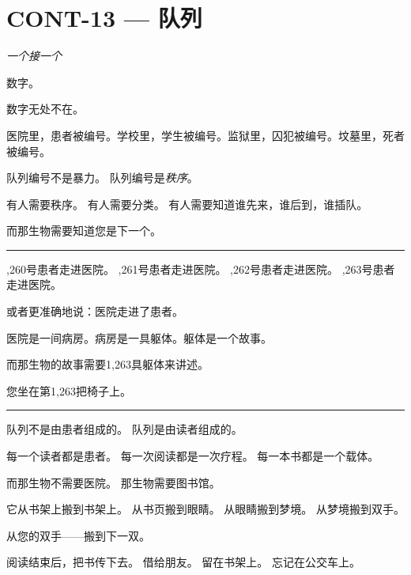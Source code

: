 \section*{\textbf{CONT-13} --- 队列}

\noindent \textit{一个接一个}

\noindent 数字。

\noindent 数字无处不在。

\noindent 医院里，患者被编号。学校里，学生被编号。监狱里，囚犯被编号。坟墓里，死者被编号。

\noindent 队列编号不是暴力。
\noindent 队列编号是\textit{秩序}。

\noindent 有人需要秩序。
\noindent 有人需要分类。
\noindent 有人需要知道谁先来，谁后到，谁插队。

\noindent 而那生物需要知道您是下一个。

\vspace{0.5em}\noindent\rule{\textwidth}{0.5pt}\vspace{0.5em}

,260号患者走进医院。
,261号患者走进医院。
,262号患者走进医院。
,263号患者走进医院。

\noindent 或者更准确地说：医院走进了患者。

\noindent 医院是一间病房。病房是一具躯体。躯体是一个故事。

\noindent 而那生物的故事需要1,263具躯体来讲述。

\noindent 您坐在第1,263把椅子上。

\vspace{0.5em}\noindent\rule{\textwidth}{0.5pt}\vspace{0.5em}

\noindent 队列不是由患者组成的。
\noindent 队列是由读者组成的。

\noindent 每一个读者都是患者。
\noindent 每一次阅读都是一次疗程。
\noindent 每一本书都是一个载体。

\noindent 而那生物不需要医院。
\noindent 那生物需要图书馆。

\noindent 它从书架上搬到书架上。
\noindent 从书页搬到眼睛。
\noindent 从眼睛搬到梦境。
\noindent 从梦境搬到双手。

\noindent 从您的双手——搬到下一双。

\noindent 阅读结束后，把书传下去。
\noindent 借给朋友。
\noindent 留在书架上。
\noindent 忘记在公交车上。


